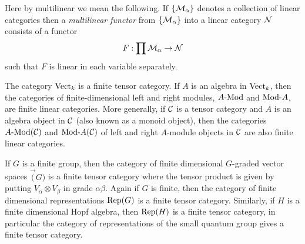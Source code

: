\documentclass{amsart}
\begin{document}
	Here by multilinear we mean the following.  If $\{\mathcal M_\alpha\}$ denotes a collection of linear categories then a {\em multilinear functor} from $\{\mathcal M_\alpha\}$ into a linear category $\mathcal N$ consists of a functor
\begin{equation*}
	F: \prod \mathcal M_\alpha \to \mathcal N
\end{equation*}
such that $F$ is linear in each variable separately. 



\begin{example}
	The category $\mathrm{Vect}_k$ is a finite tensor category. If $A$ is an algebra in $\mathrm{Vect}_k$, then the categories of finite-dimensional left and right modules, $\Mod{A}{}$ and $\Mod{}{A}$, are finite linear categories. More generally, if $\mathcal C$ is a tensor category and $A$ is an algebra object in $\mathcal C$ (also known as a monoid object), then the categories $\Mod{A}{}(\cC)$ and $\Mod{}{A}(\cC)$ of left and right $A$-module objects in $\mathcal C$ are also finite linear categories.
\end{example}

\begin{example}
If $G$ is a finite group, then the category of finite dimensional $G$-graded vector spaces $\Vec(G)$ is a finite tensor category where the tensor product is given by putting $V_\alpha \otimes V_\beta$ in grade $\alpha \beta$.  Again if $G$ is finite, then the category of finite dimensional representations $\mathrm{Rep}(G)$ is a finite tensor category.  Similarly, if $H$ is a finite dimensional Hopf algebra, then $\mathrm{Rep}(H)$ is a finite tensor category, in particular the category of representations of the small quantum group gives a finite tensor category.
\end{example}

\end{document}
